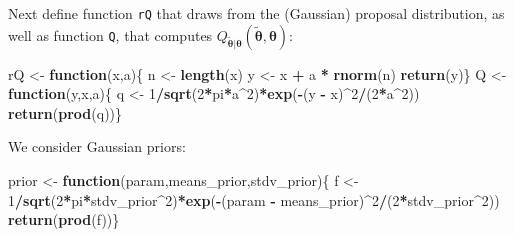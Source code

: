 \documentclass[
  12pt,
]{book}
\newenvironment{Shaded}{\begin{snugshade}}{\end{snugshade}}
\newcommand{\ControlFlowTok}[1]{\textcolor[rgb]{0.13,0.29,0.53}{\textbf{#1}}}
\newcommand{\DecValTok}[1]{\textcolor[rgb]{0.00,0.00,0.81}{#1}}
\newcommand{\FunctionTok}[1]{\textcolor[rgb]{0.13,0.29,0.53}{\textbf{#1}}}
\newcommand{\NormalTok}[1]{#1}
\newcommand{\OtherTok}[1]{\textcolor[rgb]{0.56,0.35,0.01}{#1}}
\newcommand{\SpecialCharTok}[1]{\textcolor[rgb]{0.81,0.36,0.00}{\textbf{#1}}}
\theoremstyle{definition}
\theoremstyle{definition}
\theoremstyle{definition}
\theoremstyle{definition}
\theoremstyle{remark}
\begin{document}
Next define function \texttt{rQ} that draws from the (Gaussian) proposal distribution, as well as function \texttt{Q}, that computes \(Q_{\tilde{\boldsymbol\theta}|{\boldsymbol\theta}}(\tilde{\boldsymbol\theta},{\boldsymbol\theta})\):

\begin{Shaded}
\begin{Highlighting}[]
\NormalTok{rQ }\OtherTok{\textless{}{-}} \ControlFlowTok{function}\NormalTok{(x,a)\{}
\NormalTok{  n }\OtherTok{\textless{}{-}} \FunctionTok{length}\NormalTok{(x)}
\NormalTok{  y }\OtherTok{\textless{}{-}}\NormalTok{ x }\SpecialCharTok{+}\NormalTok{ a }\SpecialCharTok{*} \FunctionTok{rnorm}\NormalTok{(n)}
  \FunctionTok{return}\NormalTok{(y)\}}
\NormalTok{Q }\OtherTok{\textless{}{-}} \ControlFlowTok{function}\NormalTok{(y,x,a)\{}
\NormalTok{  q }\OtherTok{\textless{}{-}} \DecValTok{1}\SpecialCharTok{/}\FunctionTok{sqrt}\NormalTok{(}\DecValTok{2}\SpecialCharTok{*}\NormalTok{pi}\SpecialCharTok{*}\NormalTok{a}\SpecialCharTok{\^{}}\DecValTok{2}\NormalTok{)}\SpecialCharTok{*}\FunctionTok{exp}\NormalTok{(}\SpecialCharTok{{-}}\NormalTok{(y }\SpecialCharTok{{-}}\NormalTok{ x)}\SpecialCharTok{\^{}}\DecValTok{2}\SpecialCharTok{/}\NormalTok{(}\DecValTok{2}\SpecialCharTok{*}\NormalTok{a}\SpecialCharTok{\^{}}\DecValTok{2}\NormalTok{))}
  \FunctionTok{return}\NormalTok{(}\FunctionTok{prod}\NormalTok{(q))\}}
\end{Highlighting}
\end{Shaded}

We consider Gaussian priors:

\begin{Shaded}
\begin{Highlighting}[]
\NormalTok{prior }\OtherTok{\textless{}{-}} \ControlFlowTok{function}\NormalTok{(param,means\_prior,stdv\_prior)\{}
\NormalTok{  f }\OtherTok{\textless{}{-}} \DecValTok{1}\SpecialCharTok{/}\FunctionTok{sqrt}\NormalTok{(}\DecValTok{2}\SpecialCharTok{*}\NormalTok{pi}\SpecialCharTok{*}\NormalTok{stdv\_prior}\SpecialCharTok{\^{}}\DecValTok{2}\NormalTok{)}\SpecialCharTok{*}\FunctionTok{exp}\NormalTok{(}\SpecialCharTok{{-}}\NormalTok{(param }\SpecialCharTok{{-}} 
\NormalTok{                                         means\_prior)}\SpecialCharTok{\^{}}\DecValTok{2}\SpecialCharTok{/}\NormalTok{(}\DecValTok{2}\SpecialCharTok{*}\NormalTok{stdv\_prior}\SpecialCharTok{\^{}}\DecValTok{2}\NormalTok{))}
  \FunctionTok{return}\NormalTok{(}\FunctionTok{prod}\NormalTok{(f))\}}
\end{Highlighting}
\end{Shaded}
\end{document}
